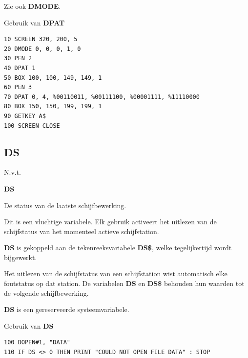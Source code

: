 \begin{description}[leftmargin=2cm,style=nextline]
                  Zie ook {\bf DMODE}.

\item [Voorbeeld:]  Gebruik van {\bf DPAT}

\begin{tcolorbox}[colback=black,coltext=white]
\verbatimfont{\codefont}
\begin{verbatim}
10 SCREEN 320, 200, 5
20 DMODE 0, 0, 0, 1, 0
30 PEN 2
40 DPAT 1
50 BOX 100, 100, 149, 149, 1
60 PEN 3
70 DPAT 0, 4, %00110011, %00111100, %00001111, %11110000
80 BOX 150, 150, 199, 199, 1
90 GETKEY A$
100 SCREEN CLOSE
\end{verbatim}
\end{tcolorbox}
\end{description}


\newpage
\subsection{DS}
\begin{description}[leftmargin=2cm,style=nextline]
\item [Token:]    N.v.t.

\item [Formaat:]   {\bf DS}

\item [Gebruik:]    De status van de laatste schijfbewerking.

                  Dit is een vluchtige variabele. Elk gebruik activeert het uitlezen van de schijfstatus van het momenteel actieve schijfstation.

                  {\bf DS} is gekoppeld aan de tekenreeksvariabele {\bf DS\$}, welke tegelijkertijd wordt bijgewerkt.

                  Het uitlezen van de schijfstatus van een schijfstation wist automatisch elke foutstatus op dat station. De variabelen {\bf DS} en {\bf DS\$} behouden hun waarden tot de volgende schijfbewerking.

\item [Opmerkingen:]  {\bf DS} is een gereserveerde systeemvariabele.

\item [Voorbeeld:]  Gebruik van {\bf DS}

\begin{tcolorbox}[colback=black,coltext=white]
\verbatimfont{\codefont}
\begin{verbatim}
100 DOPEN#1, "DATA"
110 IF DS <> 0 THEN PRINT "COULD NOT OPEN FILE DATA" : STOP
\end{verbatim}
\end{tcolorbox}
\end{description}

